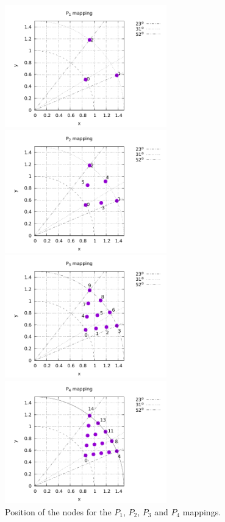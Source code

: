 \begin{center}
\includegraphics[width=7cm]{images/mappings/curved_triangles/nodesP1.pdf}
\includegraphics[width=7cm]{images/mappings/curved_triangles/nodesP2.pdf}\\
\includegraphics[width=7cm]{images/mappings/curved_triangles/nodesP3.pdf}
\includegraphics[width=7cm]{images/mappings/curved_triangles/nodesP4.pdf}\\
{\captionfont Position of the nodes for the $P_1$, $P_2$, $P_3$ and $P_4$ mappings.}
\end{center}

